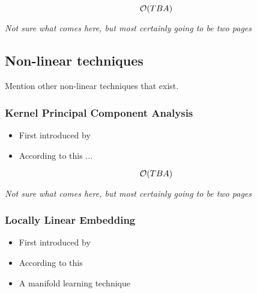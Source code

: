 $$\mathcal{O}(TBA)$$

\clearpage


\begin{center}
	\textit{Not sure what comes here, but most certainly going to be two pages}
\end{center}

\clearpage









\subsection{Non-linear techniques}

Mention other non-linear techniques that exist.





\subsubsection{Kernel Principal Component Analysis}

\begin{itemize}
	\item First introduced by \cite{scholkopf1998nonlinear}
	\item According to this ...%
\end{itemize}

$$\mathcal{O}(TBA)$$

\clearpage

\begin{center}
	\textit{Not sure what comes here, but most certainly going to be two pages}
\end{center}

\clearpage







\subsubsection{Locally Linear Embedding}

\begin{itemize}
	\item First introduced by \cite{roweis2000nonlinear}
	\item According to this \cite{DRUnsupervisedNearestNeighbors}
	\item A manifold learning technique \cite{HandsOnMLCh8}
\end{itemize}

